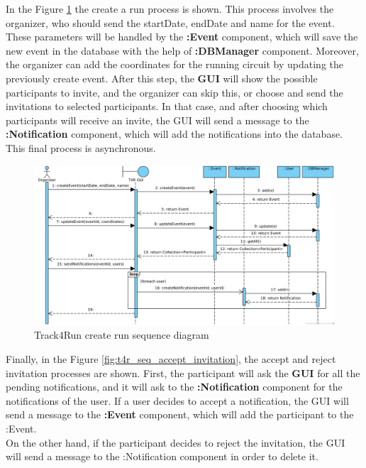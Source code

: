 \documentclass[a4paper, hidelinks, 12pt]{report}
\begin{document}
\begin{itemize}
	In the Figure \ref{fig:t4r_seq_create_run} the create a run process is shown. This process involves the organizer, who should send the startDate, endDate and name for the event. These parameters will be handled by the \textbf{:Event} component, which will save the new event in the database with the help of \textbf{:DBManager} component. Moreover, the organizer can add the coordinates for the running circuit by updating the previously create event. After this step, the \textbf{GUI} will show the possible participants to invite, and the organizer can skip this, or choose and send the invitations to selected participants. In that case, and after choosing which participants will receive an invite, the GUI will send a message to the \textbf{:Notification} component, which will add the notifications into the database. This final process is asynchronous.\\
	
	\begin{figure}[H]
		\centering
		\includegraphics[width=1\textwidth]{diagrams/sequence_diagrams/t4r_create_run.png}
		\caption[Track4Run create run sequence diagram]{Track4Run create run sequence diagram}
		\label{fig:t4r_seq_create_run}
	\end{figure}
	
	Finally, in the Figure \ref{fig:t4r_seq_accept_invitation}, the accept and reject invitation processes are shown. First, the participant will ask the \textbf{GUI} for all the pending notifications, and it will ask to the \textbf{:Notification} component for the notifications of the user. If a user decides to accept a notification, the GUI will send a message to the \textbf{:Event} component, which will add the participant to the :Event.\\

	 On the other hand, if the participant decides to reject the invitation, the GUI will send a message to the :Notification component in order to delete it.\\
	 

\end{itemize}
\end{document}
